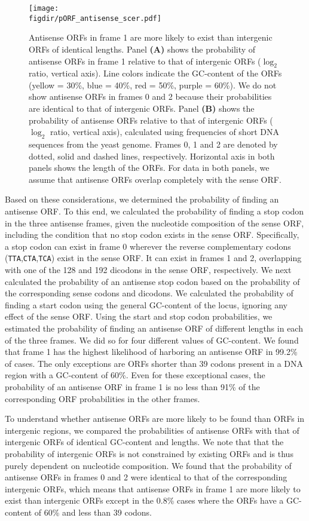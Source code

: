 \documentclass[12pt,a4paper]{article}
\begin{document}
\begin{figure}[!t]
\centering
\texttt{[image: \\figdir/pORF\_antisense\_scer.pdf]}
\caption{Antisense ORFs in frame 1 are more likely to exist than intergenic ORFs of identical lengths. Panel \textbf{(A)} shows the probability of antisense ORFs in frame 1 relative to that of intergenic ORFs ($\log_2$ ratio, vertical axis). Line colors indicate the GC-content of the ORFs (yellow = 30\%, blue = 40\%, red = 50\%, purple = 60\%). We do not show antisense ORFs in frames 0 and 2 because their probabilities are identical to that of intergenic ORFs. Panel \textbf{(B)} shows the probability of antisense ORFs relative to that of intergenic ORFs ($\log_2$ ratio, vertical axis), calculated using frequencies of short DNA sequences from the yeast genome. Frames 0, 1 and 2 are denoted by dotted, solid and dashed lines, respectively. Horizontal axis in both panels shows the length of the ORFs. For data in both panels, we assume that antisense ORFs overlap completely with the sense ORF.}
\label{pORF}
\end{figure}

Based on these considerations, we determined the probability of finding an antisense ORF. To this end, we calculated the probability of finding a stop codon in the three antisense frames, given the nucleotide composition of the sense ORF, including the condition that no stop codon exists in the sense ORF. Specifically, a stop codon can exist in frame 0 wherever the reverse complementary codons (\texttt{TTA},\texttt{CTA},\texttt{TCA}) exist in the sense ORF. It can exist in frames 1 and 2, overlapping with one of the 128 and 192 dicodons in the sense ORF, respectively. We next calculated the probability of an antisense stop codon based on the probability of the corresponding sense codons and dicodons. We calculated the probability of finding a start codon using the general GC-content of the locus, ignoring any effect of the sense ORF. Using the start and stop codon probabilities, we estimated the probability of finding an antisense ORF of different lengths in each of the three frames. We did so for four different values of GC-content. We found that frame 1 has the highest likelihood of harboring an antisense ORF in 99.2\% of cases. The only exceptions are ORFs shorter than 39 codons present in a DNA region with a GC-content of 60\%. Even for these exceptional cases, the probability of an antisense ORF in frame 1 is no less than 91\% of the corresponding ORF probabilities in the other frames. 

To understand whether antisense ORFs are more likely to be found than ORFs in intergenic regions, we compared the probabilities of antisense ORFs with that of intergenic ORFs of identical GC-content and lengths. We note that that the probability of intergenic ORFs is not constrained by existing ORFs and is thus purely dependent on nucleotide composition. We found that the probability of antisense ORFs in frames 0 and 2 were identical to that of the corresponding intergenic ORFs, which means that antisense ORFs in frame 1 are more likely to exist than intergenic ORFs except in the 0.8\% cases where the ORFs have a GC-content of 60\% and less than 39 codons. 
\end{document}
